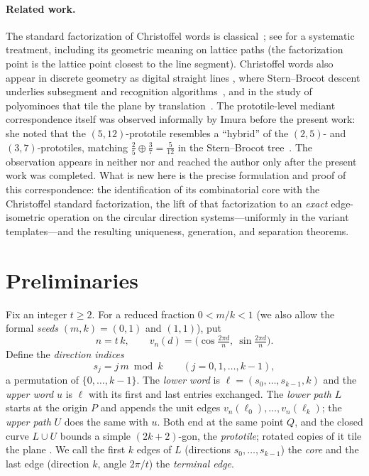 \documentclass[11pt]{article}
\theoremstyle{remark}
\theoremstyle{definition}
\begin{document}
\paragraph{Related work.}
The standard factorization of Christoffel words is classical~\cite{BorelLaubie1993}; see
\cite{BLRS2008} for a systematic treatment, including its geometric meaning on lattice
paths (the factorization point is the lattice point closest to the line segment).
Christoffel words also appear in discrete geometry as digital straight lines
\cite{KletteRosenfeld2004}, where Stern--Brocot descent underlies subsegment and
recognition algorithms~\cite{SaidLachaud2011}, and in the study of polyominoes that tile
the plane by translation~\cite{BlondinMasse2009}.
The prototile-level mediant correspondence itself was observed informally by Imura
before the present work: she noted that the $(5,12)$-prototile resembles a ``hybrid''
of the $(2,5)$- and $(3,7)$-prototiles, matching
$\tfrac{2}{5}\oplus\tfrac{3}{7}=\tfrac{5}{12}$ in the Stern--Brocot
tree~\cite{ImuraPost2025}. The observation appears in neither \cite{Imura2025} nor
\cite{Imura2026} and reached the author only after the present work was completed. What is new here is the precise formulation
and proof of this correspondence: the identification of its combinatorial core with
the Christoffel standard factorization, the lift of that factorization to an
\emph{exact} edge-isometric operation on the circular direction systems---uniformly
in the variant templates---and the resulting uniqueness, generation, and separation
theorems.

\section{Preliminaries}\label{sec:prelim}

Fix an integer $t\ge 2$. For a reduced fraction $0< m/k< 1$ (we also allow the formal
\emph{seeds} $(m,k)=(0,1)$ and $(1,1)$), put
\[
n = t\,k, \qquad
v_n(d) = \bigl(\cos\tfrac{2\pi d}{n},\ \sin\tfrac{2\pi d}{n}\bigr).
\]
Define the \emph{direction indices}
\[
s_j = j\,m \bmod k \qquad (j=0,1,\dots,k-1),
\]
a permutation of $\{0,\dots,k-1\}$. The \emph{lower word} is
$\ell=(s_0,\dots,s_{k-1},k)$ and the \emph{upper word} $u$ is $\ell$ with its first and
last entries exchanged. The \emph{lower path} $L$ starts at the origin $P$ and appends the
unit edges $v_n(\ell_0),\dots,v_n(\ell_k)$; the \emph{upper path} $U$ does the same with
$u$. Both end at the same point $Q$, and the closed curve $L\cup U$ bounds a simple
$(2k+2)$-gon, the \emph{prototile}; rotated copies of it tile the plane
\cite[Thm.~6.11]{Imura2025}. We call the first $k$ edges of $L$ (directions
$s_0,\dots,s_{k-1}$) the \emph{core} and the last edge (direction $k$, angle $2\pi/t$)
the \emph{terminal edge}.
\end{document}
